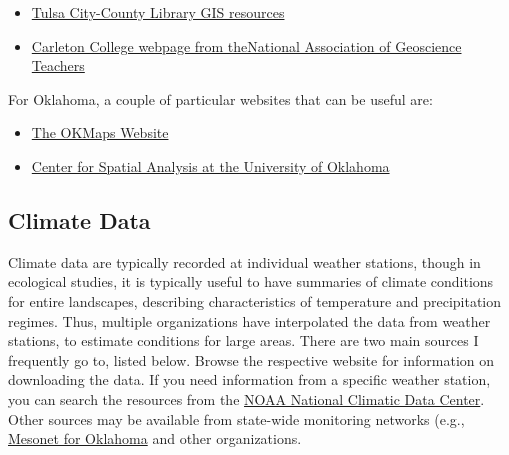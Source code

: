 \documentclass[12pt,]{article}
\begin{document}
\begin{itemize}
\itemsep1pt\parskip0pt
\item
  \href{http://guides.tulsalibrary.org/content.php?pid=557423\&sid=4599537}{Tulsa
  City-County Library GIS resources}
\item
  \href{http://serc.carleton.edu/NAGTWorkshops/gis/state_resources.html}{Carleton
  College webpage from theNational Association of Geoscience Teachers}
\end{itemize}

For Oklahoma, a couple of particular websites that can be useful are:

\begin{itemize}
\itemsep1pt\parskip0pt
\item
  \href{http://ogi.state.ok.us/ogi/search.aspx}{The OKMaps Website}
\item
  \href{http://geo.ou.edu/DataFrame.htm}{Center for Spatial Analysis at
  the University of Oklahoma}
\end{itemize}

\subsection{Climate Data}\label{climate-data}

Climate data are typically recorded at individual weather stations,
though in ecological studies, it is typically useful to have summaries
of climate conditions for entire landscapes, describing characteristics
of temperature and precipitation regimes. Thus, multiple organizations
have interpolated the data from weather stations, to estimate conditions
for large areas. There are two main sources I frequently go to, listed
below. Browse the respective website for information on downloading the
data. If you need information from a specific weather station, you can
search the resources from the
\href{http://www.ncdc.noaa.gov/data-access/land-based-station-data}{NOAA
National Climatic Data Center}. Other sources may be available from
state-wide monitoring networks (e.g.,
\href{https://www.mesonet.org/}{Mesonet for Oklahoma} and other
organizations.
\end{document}
